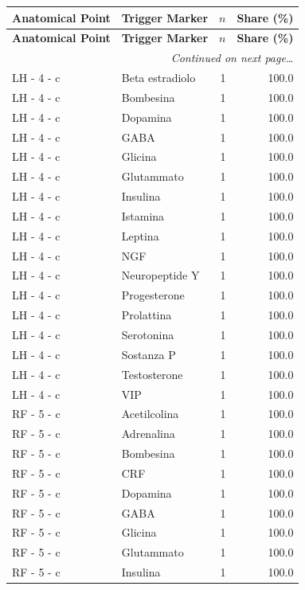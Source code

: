 \documentclass[a4paper,11pt]{article}
\begin{document}
\begin{footnotesize}
\begin{longtable}{p{3.5cm}p{7.5cm}rr}
\toprule
\textbf{Anatomical Point} &
\textbf{Trigger Marker} &
\textbf{$n$} &
\textbf{Share (\%)} \\
\midrule
\endfirsthead
\toprule
\textbf{Anatomical Point} &
\textbf{Trigger Marker} &
\textbf{$n$} &
\textbf{Share (\%)} \\
\midrule
\endhead
\midrule
\multicolumn{4}{r}{\footnotesize\emph{Continued on next page\ldots}} \\
\endfoot
\bottomrule
\endlastfoot
LH - 4 - c & Beta estradiolo & 1 & 100.0 \\
LH - 4 - c & Bombesina & 1 & 100.0 \\
LH - 4 - c & Dopamina & 1 & 100.0 \\
LH - 4 - c & GABA & 1 & 100.0 \\
LH - 4 - c & Glicina & 1 & 100.0 \\
LH - 4 - c & Glutammato & 1 & 100.0 \\
LH - 4 - c & Insulina & 1 & 100.0 \\
LH - 4 - c & Istamina & 1 & 100.0 \\
LH - 4 - c & Leptina & 1 & 100.0 \\
LH - 4 - c & NGF & 1 & 100.0 \\
LH - 4 - c & Neuropeptide Y & 1 & 100.0 \\
LH - 4 - c & Progesterone & 1 & 100.0 \\
LH - 4 - c & Prolattina & 1 & 100.0 \\
LH - 4 - c & Serotonina & 1 & 100.0 \\
LH - 4 - c & Sostanza P & 1 & 100.0 \\
LH - 4 - c & Testosterone & 1 & 100.0 \\
LH - 4 - c & VIP & 1 & 100.0 \\
RF - 5 - c & Acetilcolina & 1 & 100.0 \\
RF - 5 - c & Adrenalina & 1 & 100.0 \\
RF - 5 - c & Bombesina & 1 & 100.0 \\
RF - 5 - c & CRF & 1 & 100.0 \\
RF - 5 - c & Dopamina & 1 & 100.0 \\
RF - 5 - c & GABA & 1 & 100.0 \\
RF - 5 - c & Glicina & 1 & 100.0 \\
RF - 5 - c & Glutammato & 1 & 100.0 \\
RF - 5 - c & Insulina & 1 & 100.0 \\

\end{longtable}
\end{footnotesize}
\end{document}
